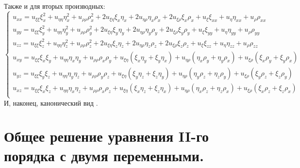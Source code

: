 \documentclass[9pt]{article}
\begin{document}
Также и для вторых производных:
\[\left\{\begin{array}{l}
    u_{xx}=u_{\xi\xi}\xi_x^2+u_{\eta\eta}\eta_x^2+u_{\rho\rho}\rho_x^2+2u_{\xi\eta}\xi_x\eta_x+2u_{\eta\rho}\eta_x\rho_x+2u_{\xi\rho}\xi_x\rho_x +u_\xi\xi_{xx}+u_\eta\eta_{xx}+u_\rho\rho_{xx}\\
    u_{yy}=u_{\xi\xi}\xi_y^2+u_{\eta\eta}\eta_y^2+u_{\rho\rho}\rho_y^2+2u_{\xi\eta}\xi_y\eta_y+2u_{\eta\rho}\eta_y\rho_y+2u_{\xi\rho}\xi_y\rho_y +u_\xi\xi_{yy}+u_\eta\eta_{yy}+u_\rho\rho_{yy}\\
    u_{zz}=u_{\xi\xi}\xi_z^2+u_{\eta\eta}\eta_z^2+u_{\rho\rho}\rho_z^2+2u_{\xi\eta}\xi_z\eta_z+2u_{\eta\rho}\eta_z\rho_z+2u_{\xi\rho}\xi_z\rho_z +u_\xi\xi_{zz}+u_\eta\eta_{zz}+u_\rho\rho_{zz}\\
    u_{xy}=u_{\xi\xi}\xi_x\xi_y+u_{\eta\eta}\eta_x\eta_y+u_{\rho\rho}\rho_x\rho_y+u_{\xi\eta}(\xi_x\eta_y+\xi_y\eta_x)+u_{\eta\rho}(\eta_x\rho_y+\eta_y\rho_x)+u_{\xi\rho}(\xi_x\rho_y+\xi_y\rho_x)\\
    u_{yz}=u_{\xi\xi}\xi_y\xi_z+u_{\eta\eta}\eta_y\eta_z+u_{\rho\rho}\rho_y\rho_z+u_{\xi\eta}(\xi_y\eta_z+\xi_z\eta_y)+u_{\eta\rho}(\eta_y\rho_z+\eta_z\rho_y)+u_{\xi\rho}(\xi_y\rho_z+\xi_z\rho_y)\\
    u_{xz}=u_{\xi\xi}\xi_x\xi_z+u_{\eta\eta}\eta_x\eta_z+u_{\rho\rho}\rho_x\rho_z+u_{\xi\eta}(\xi_x\eta_z+\xi_z\eta_x)+u_{\eta\rho}(\eta_x\rho_z+\eta_z\rho_x)+u_{\xi\rho}(\xi_x\rho_z+\xi_z\rho_x)\\
\end{array}\right.\]
И, наконец, канонический вид .

\section{Общее решение уравнения II-го порядка с двумя переменными.}
\end{document}
